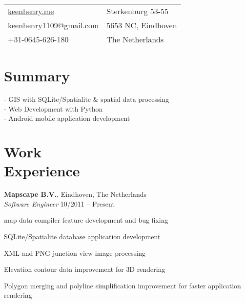 \documentclass[margin,line]{resume}
\begin{document}
\begin{resume}

      \begin{tabular}{@{}p{6cm}p{8.5cm}}
      \url{keenhenry.me}      & Sterkenburg 53-55 \\
      keenhenry1109@gmail.com & 5653 NC, Eindhoven \\
      +31-0645-626-180        & The Netherlands \\
      \end{tabular}

 
    \section{\mysidestyle Summary}
      - GIS with SQLite/Spatialite \& spatial data processing \\
      - Web Development with Python \\
      - Android mobile application development \\
      
    \section{\mysidestyle Work \\ Experience}

    \textbf{Mapscape B.V.}, Eindhoven, The Netherlands \\
    \textsl{Software Engineer} \hfill 10/2011 -- Present \vspace{-3mm}\\\vspace{-1mm}%
      \begin{list2}
      \item map data compiler feature development and bug fixing
      \item SQLite/Spatialite database application development
      \item XML and PNG junction view image processing
      \item Elevation contour data improvement for 3D rendering
      \item Polygon merging and polyline simplification improvement for faster application rendering
      \end{list2}


\end{resume}
\end{document}
